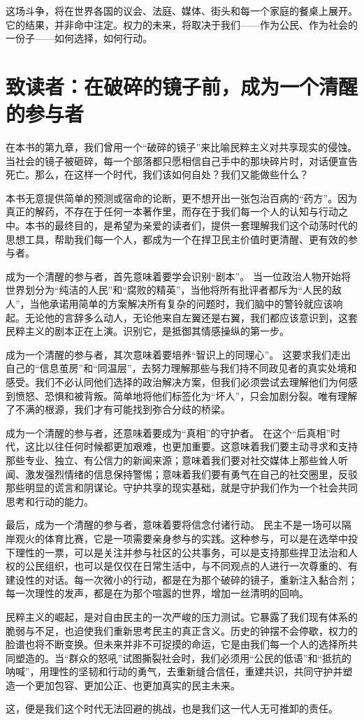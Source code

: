 这场斗争，将在世界各国的议会、法庭、媒体、街头和每一个家庭的餐桌上展开。它的结果，并非命中注定。权力的未来，将取决于我们——作为公民、作为社会的一份子——如何选择，如何行动。

\section{致读者：在破碎的镜子前，成为一个清醒的参与者}

在本书的第九章，我们曾用一个“破碎的镜子”来比喻民粹主义对共享现实的侵蚀。当社会的镜子被砸碎，每一个部落都只愿相信自己手中的那块碎片时，对话便宣告死亡。那么，在这样一个时代，我们该如何自处？我们又能做些什么？

本书无意提供简单的预测或宿命的论断，更不想开出一张包治百病的“药方”。因为真正的解药，不存在于任何一本著作里，而存在于我们每一个人的认知与行动之中。本书的最终目的，是希望为亲爱的读者们，提供一套理解我们这个动荡时代的思想工具，帮助我们每一个人，都成为一个在捍卫民主价值时更清醒、更有效的参与者。

成为一个清醒的参与者，首先意味着要学会识别“剧本”。 当一位政治人物开始将世界划分为“纯洁的人民”和“腐败的精英”，当他将所有批评者都斥为“人民的敌人”，当他承诺用简单的方案解决所有复杂的问题时，我们脑中的警铃就应该响起。无论他的言辞多么动人，无论他来自左翼还是右翼，我们都应该意识到，这套民粹主义的剧本正在上演。识别它，是抵御其情感操纵的第一步。

成为一个清醒的参与者，其次意味着要培养“智识上的同理心”。 这要求我们走出自己的“信息茧房”和“同温层”，去努力理解那些与我们持不同政见者的真实处境和感受。我们不必认同他们选择的政治解决方案，但我们必须尝试去理解他们为何感到愤怒、恐惧和被背叛。简单地将他们标签化为“坏人”，只会加剧分裂。唯有理解了不满的根源，我们才有可能找到弥合分歧的桥梁。

成为一个清醒的参与者，还意味着要成为“真相”的守护者。 在这个“后真相”时代，这比以往任何时候都更加艰难，也更加重要。这意味着我们要主动寻求和支持那些专业、独立、有公信力的新闻来源；意味着我们要对社交媒体上那些耸人听闻、激发强烈情绪的信息保持警惕；意味着我们要有勇气在自己的社交圈里，反驳那些明显的谎言和阴谋论。守护共享的现实基础，就是守护我们作为一个社会共同思考和行动的能力。

最后，成为一个清醒的参与者，意味着要将信念付诸行动。 民主不是一场可以隔岸观火的体育比赛，它是一项需要亲身参与的实践。这种参与，可以是在选举中投下理性的一票，可以是关注并参与社区的公共事务，可以是支持那些捍卫法治和人权的公民组织，也可以是仅仅在日常生活中，与不同观点的人进行一次尊重的、有建设性的对话。每一次微小的行动，都是在为那个破碎的镜子，重新注入黏合剂；每一次理性的发声，都是在为那个喧嚣的世界，增加一丝清明的回响。

民粹主义的崛起，是对自由民主的一次严峻的压力测试。它暴露了我们现有体系的脆弱与不足，也迫使我们重新思考民主的真正含义。历史的钟摆不会停歇，权力的脸谱也将不断变换。但未来并非不可捉摸的命运，它是由我们每一个人的选择所共同塑造的。当“群众的怒吼”试图撕裂社会时，我们必须用“公民的低语”和“抵抗的呐喊”，用理性的坚韧和行动的勇气，去重新缝合信任，重建共识，共同守护并塑造一个更加包容、更加公正、也更加真实的民主未来。

这，便是我们这个时代无法回避的挑战，也是我们这一代人无可推卸的责任。